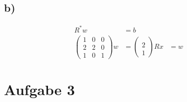 \documentclass[10pt,a4paper]{article}
\begin{document}
\subsection*{b)}
\begin{align*}
    R^*w &= b\\
    \left(\begin{matrix}
        1 & 0 & 0 \\
        2 & 2 & 0 \\
        1 & 0 & 1
    \end{matrix}\right) w &=  \left(\begin{matrix}
         \\
        2 \\
        1
    \end{matrix}\right)
    Rx &= w
\end{align*}

\section*{Aufgabe 3}

\end{document}

